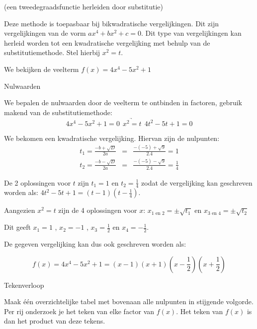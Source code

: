 \begin{voorbeeld}
	 (een tweedegraadsfunctie herleiden door substitutie)

Deze methode is toepasbaar bij bikwadratische vergelijkingen. Dit
zijn vergelijkingen van de vorm $ax^{4}+bx^{2}+c=0$. Dit type van
vergelijkingen kan herleid worden tot een kwadratische vergelijking
met behulp van de substitutiemethode. Stel hierbij $x^{2}=t$.

We bekijken de veelterm $f(x)=4x^{4}-5x^{2}+1$

Nulwaarden

 We bepalen de nulwaarden door de veelterm te ontbinden in
factoren, gebruik makend van de substitutiemethode:\\

\begin{equation*}
4x^{4}-5x^{2}+1=0 \ \   \underrightarrow{x^{2}=t}  \ \ 4t^{2}-5t+1=0
\end{equation*}

 We bekomen een kwadratische vergelijking. Hiervan zijn de
nulpunten:
\begin{eqnarray*}
t_{1}=\frac{-b+\sqrt{D}}{2a}&=&\frac{-(-5)+\sqrt{9}}{2.4}=1 \\
t_{2}=\frac{-b-\sqrt{D}}{2a}&=&\frac{-(-5)-\sqrt{9}}{2.4}=\frac{1}{4}
\end{eqnarray*}

De 2 oplossingen voor $t$ zijn $t_{1}=1$ en $t_{2}=\frac{1}{4}$
zodat de vergelijking kan geschreven worden als: $4t^{2}-5t+1=(t-1)(t-\frac{1}{4})$.

Aangezien $x^{2}=t$ zijn de 4 oplossingen voor $x$: $x_{1 \text{ en }2}=\pm\sqrt{t_{1}}$
en $x_{3 \text{ en } 4}=\pm\sqrt{t_{2}}$ 

Dit geeft $x_{1}=1$ , $x_{2}=-1$ , $x_{3}=\frac{1}{2}$
en $x_{4}=-\frac{1}{2}$.

De gegeven vergelijking kan dus ook geschreven worden als:

\begin{equation*}
f(x)=4x^{4}-5x^{2}+1=(x-1)(x+1)(x-\frac{1}{2})(x+\frac{1}{2})
\end{equation*}

Tekenverloop

Maak \'e\'en overzichtelijke tabel met bovenaan alle nulpunten
in stijgende volgorde. Per rij onderzoek je het teken van elke factor
van $f(x)$. Het teken van $f(x)$ is dan het product van deze tekens.


\end{voorbeeld}
